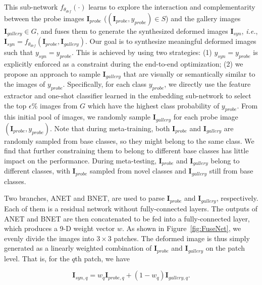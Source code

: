 \documentclass[10pt,letterpaper,twocolumn]{article}
\begin{document}
This sub-network $f_{\theta_{def}}\left(\cdot\right)$ learns to explore
the interaction and complementarity between the probe images $\mathbf{I}_{probe}$
($\left( \mathbf{I}_{probe},y_{probe}\right) \in S$) and the gallery
images $\mathbf{I}_{gallery}\in G$, and fuses them to generate the
synthesized deformed images $\mathbf{I}_{syn}$, \emph{i.e.}, $\mathbf{I}_{syn}=f_{\theta_{def}}\left(\mathbf{I}_{probe},\mathbf{I}_{gallery}\right)$.
Our goal is to synthesize meaningful deformed images such that
$y_{syn}=y_{probe}$. This is achieved by using two strategies: (1)
$y_{syn}=y_{probe}$ is explicitly enforced as a constraint during
the end-to-end optimization; (2) we propose an approach
to sample $\mathbf{I}_{gallery}$ that are visually or semantically
similar to the images of $y_{probe}$. Specifically, for each class $y_{probe}$, we directly use
the feature extractor and one-shot classifier learned in the embedding
sub-network to select the top $\epsilon\%$ images from $G$ which
have the highest class probability of $y_{probe}$. From this initial pool of images, we randomly sample $\mathbf{I}_{gallery}$ for each probe image $\left( \mathbf{I}_{probe},y_{probe}\right)$. Note that during meta-training, both $\mathbf{I}_{probe}$ and $\mathbf{I}_{gallery}$ are randomly sampled from base classes, so they might belong to the same class. We find that further constraining them to belong to different base classes has little impact on the performance. During meta-testing, $\mathbf{I}_{probe}$ and $\mathbf{I}_{gallery}$ belong to different classes, with $\mathbf{I}_{probe}$ sampled from novel classes and $\mathbf{I}_{gallery}$ still from base classes.





Two branches, ANET and BNET, are used to parse $\mathbf{I}_{probe}$
and $\mathbf{I}_{gallery}$, respectively. Each of them is a residual
network \cite{he2015deep} without fully-connected layers. The outputs
of ANET and BNET are then concatenated to be fed into a fully-connected
layer, which produces a 9-D weight vector $w$. As shown in Figure~\ref{fig:FuseNet}, we evenly divide the images into $3\times3$ patches. The deformed
image is thus simply generated as a linearly weighted combination of $\mathbf{I}_{probe}$ and $\mathbf{I}_{gallery}$ on the patch level. That is, for the $q$th patch, we have

\noindent 
\begin{equation}
\mathbf{I}_{syn,q}=w_q\mathbf{I}_{probe,q}+\left(1-w_q\right)\mathbf{I}_{gallery,q}.\label{eq:synthesize-1}
\end{equation}
\end{document}
